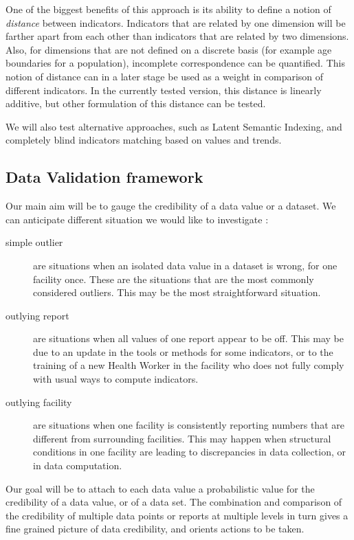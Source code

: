 \documentclass[a4paper,11pt,draft,twoside]{article}
\begin{document}
One of the biggest benefits of this approach is its ability to define a notion of \textit{distance} between indicators. Indicators that are related by one dimension will be farther apart from each other than indicators that are related by two dimensions. Also, for dimensions that are not defined on a discrete basis (for example age boundaries for a population), incomplete correspondence can be quantified. This notion of distance can in a later stage be used as a weight in comparison of different indicators. In the currently tested version, this distance is linearly additive, but other formulation of this distance can be tested.

We will also test alternative approaches, such as Latent Semantic Indexing, and completely blind indicators matching based on values and trends.

\subsection{Data Validation framework}

Our main aim will be to gauge the credibility of a data value or a dataset.  We can anticipate different situation we would like to investigate :
\begin{description}
\item[simple outlier] are situations when an isolated data value in a dataset is wrong, for one facility once. These are the situations that are the most commonly considered outliers. This may be the most straightforward situation.
\item[outlying report] are situations when all values of one report appear to be off. This may be due to an update in the tools or methods for some indicators, or to the training of a new Health Worker in the facility who does not fully comply with usual ways to compute indicators.
\item[outlying facility] are situations when one facility is consistently reporting numbers that are different from surrounding facilities. This may happen when structural conditions in one facility are leading to discrepancies in data collection, or in data computation.
\end{description}

Our goal will be to attach to each data value a probabilistic value for the credibility of a data value, or of a data set. The combination and comparison of the credibility of multiple data points or reports at multiple levels in turn gives a fine grained picture of data credibility, and orients actions to be taken.
\end{document}
